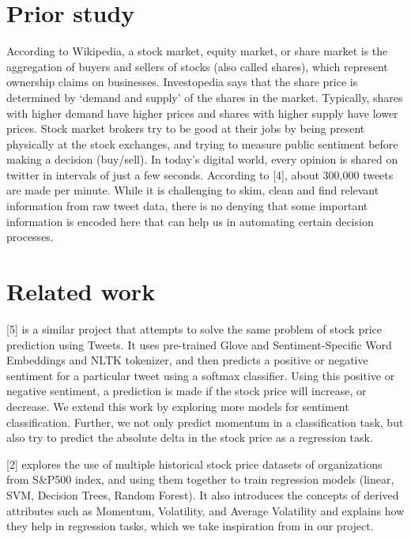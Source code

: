 \documentclass{article}
\begin{document}
\section{Prior study}
According to Wikipedia, a stock market, equity market, or share market is the aggregation of buyers and sellers of stocks (also called shares), which represent ownership claims on businesses. Investopedia says that the share price is determined by ‘demand and supply’ of the shares in the market. Typically, shares with higher demand have higher prices and shares with higher supply have lower prices. Stock market brokers try to be good at their jobs by being present physically at the stock exchanges, and trying to measure public sentiment before making a decision (buy/sell). In today's digital world, every opinion is shared on twitter in intervals of just a few seconds. According to [4], about 300,000 tweets are made per minute. While it is challenging to skim, clean and find relevant information from raw tweet data, there is no denying that some important information is encoded here that can help us in automating certain decision processes.

\section{Related work}
[5] is a similar project that attempts to solve the same problem of stock price prediction using Tweets. It uses pre-trained Glove and Sentiment-Specific Word Embeddings and NLTK tokenizer, and then predicts a positive or negative sentiment for a particular tweet using a softmax classifier. Using this positive or negative sentiment, a prediction is made if the stock price will increase, or decrease. We extend this work by exploring more models for sentiment classification. Further, we not only predict momentum in a classification task, but also try to predict the absolute delta in the stock price as a regression task.

[2] explores the use of multiple historical stock price datasets of organizations from S\&P500 index, and using them together to train regression models (linear, SVM, Decision Trees, Random Forest). It also introduces the concepts of derived attributes such as Momentum, Volatility, and Average Volatility and explains how they help in regression tasks, which we take inspiration from in our project. 
\end{document}
